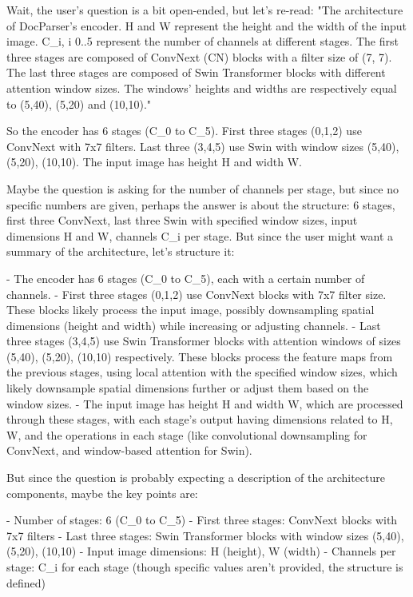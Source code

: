 Wait, the user's question is a bit open-ended, but let's re-read: "The architecture of DocParser's encoder. H and W represent the height and the width of the input image. C_i, i 0..5 represent the number of channels at different stages. The first three stages are composed of ConvNext (CN) blocks with a filter size of (7, 7). The last three stages are composed of Swin Transformer blocks with different attention window sizes. The windows' heights and widths are respectively equal to (5,40), (5,20) and (10,10)." 

So the encoder has 6 stages (C_0 to C_5). First three stages (0,1,2) use ConvNext with 7x7 filters. Last three (3,4,5) use Swin with window sizes (5,40), (5,20), (10,10). The input image has height H and width W. 

Maybe the question is asking for the number of channels per stage, but since no specific numbers are given, perhaps the answer is about the structure: 6 stages, first three ConvNext, last three Swin with specified window sizes, input dimensions H and W, channels C_i per stage. But since the user might want a summary of the architecture, let's structure it:

- The encoder has 6 stages (C_0 to C_5), each with a certain number of channels.
- First three stages (0,1,2) use ConvNext blocks with 7x7 filter size. These blocks likely process the input image, possibly downsampling spatial dimensions (height and width) while increasing or adjusting channels.
- Last three stages (3,4,5) use Swin Transformer blocks with attention windows of sizes (5,40), (5,20), (10,10) respectively. These blocks process the feature maps from the previous stages, using local attention with the specified window sizes, which likely downsample spatial dimensions further or adjust them based on the window sizes.
- The input image has height H and width W, which are processed through these stages, with each stage's output having dimensions related to H, W, and the operations in each stage (like convolutional downsampling for ConvNext, and window-based attention for Swin).

But since the question is probably expecting a description of the architecture components, maybe the key points are:

- Number of stages: 6 (C_0 to C_5)
- First three stages: ConvNext blocks with 7x7 filters
- Last three stages: Swin Transformer blocks with window sizes (5,40), (5,20), (10,10)
- Input image dimensions: H (height), W (width)
- Channels per stage: C_i for each stage (though specific values aren't provided, the structure is defined)

